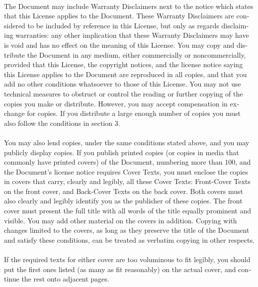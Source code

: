 \documentclass[11pt,a5paper,twoside]{book}
\begin{document}
\begin{english}
\paragraph{}The Document may include Warranty Disclaimers next to the notice which
states that this License applies to the Document.  These Warranty
Disclaimers are considered to be included by reference in this
License, but only as regards disclaiming warranties: any other
implication that these Warranty Disclaimers may have is void and has
no effect on the meaning of this License.
You may copy and distribute the Document in any medium, either
commercially or noncommercially, provided that this License, the
copyright notices, and the license notice saying this License applies
to the Document are reproduced in all copies, and that you add no
other conditions whatsoever to those of this License.  You may not use
technical measures to obstruct or control the reading or further
copying of the copies you make or distribute.  However, you may accept
compensation in exchange for copies.  If you distribute a large enough
number of copies you must also follow the conditions in section 3.
\paragraph{}You may also lend copies, under the same conditions stated above, and
you may publicly display copies.
If you publish printed copies (or copies in media that commonly have
printed covers) of the Document, numbering more than 100, and the
Document’s license notice requires Cover Texts, you must enclose the
copies in covers that carry, clearly and legibly, all these Cover
Texts: Front-Cover Texts on the front cover, and Back-Cover Texts on
the back cover.  Both covers must also clearly and legibly identify
you as the publisher of these copies.  The front cover must present
the full title with all words of the title equally prominent and
visible.  You may add other material on the covers in addition.
Copying with changes limited to the covers, as long as they preserve
the title of the Document and satisfy these conditions, can be treated
as verbatim copying in other respects.
\paragraph{}If the required texts for either cover are too voluminous to fit
legibly, you should put the first ones listed (as many as fit
reasonably) on the actual cover, and continue the rest onto adjacent
pages.

\end{english}
\end{document}
